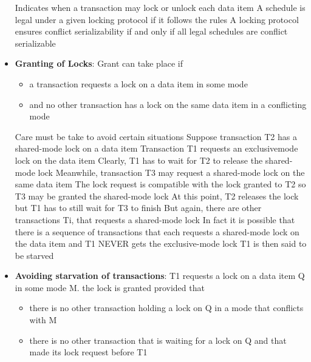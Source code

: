 \documentclass{report}
\begin{document}
\begin{itemize}
            Indicates when a transaction may lock or unlock each data item
            \bigbreak \noindent 
            A schedule is legal under a given locking protocol if it follows the rules
            \bigbreak \noindent 
            A locking protocol ensures conflict serializability if and only if all legal schedules are conflict serializable
        \item \textbf{Granting of Locks}: Grant can take place if
            \begin{itemize}
                \item a transaction requests a lock on a data item in some mode
                \item and no other transaction has a lock on the same data item in a conflicting mode
            \end{itemize}
            \bigbreak \noindent 
             Care must be take to avoid certain situations
             \bigbreak \noindent 
             Suppose transaction T2 has a shared-mode lock on a data item
             \bigbreak \noindent 
             Transaction T1 requests an exclusivemode lock on the data item
             \bigbreak \noindent 
             Clearly, T1 has to wait for T2 to release the shared-mode lock
             \bigbreak \noindent 
             Meanwhile, transaction T3 may request a shared-mode lock on the same data item 
             \bigbreak \noindent 
             The lock request is compatible with the lock granted to T2 so T3 may be granted the shared-mode lock
             \bigbreak \noindent 
             At this point, T2 releases the lock but T1 has to still wait for T3 to finish
             \bigbreak \noindent 
             But again, there are other transactions Ti, that requests a shared-mode lock
             \bigbreak \noindent 
             In fact it is possible that there is a sequence of transactions that each requests a shared-mode lock on the data item and T1 NEVER gets the exclusive-mode lock
             \bigbreak \noindent 
             T1 is then said to be starved
        \item \textbf{Avoiding starvation of transactions}: T1 requests a lock on a data item Q in some mode M. the lock is granted provided that
            \begin{itemize}
                \item there is no other transaction holding a lock on Q in a mode that conflicts with M
                \item there is no other transaction that is waiting for a lock on Q and that made its lock request before T1

\end{itemize}
\end{itemize}
\end{document}
